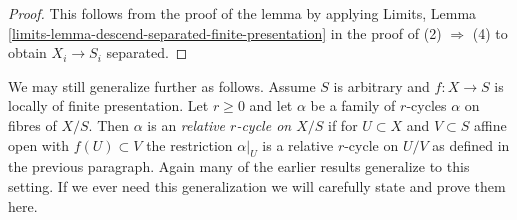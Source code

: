 \begin{proof}
This follows from the proof of the lemma by applying
Limits, Lemma \ref{limits-lemma-descend-separated-finite-presentation}
in the proof of (2) $\Rightarrow$ (4) to obtain $X_i \to S_i$ separated.
\end{proof}

\begin{remark}
\label{remark-more-general}
We may still generalize further as follows.
Assume $S$ is arbitrary and $f : X \to S$ is locally of finite presentation.
Let $r \geq 0$ and let $\alpha$ be a family of $r$-cycles $\alpha$ on fibres of
$X/S$. Then $\alpha$ is an {\it relative $r$-cycle on $X/S$} if
for $U \subset X$ and $V \subset S$ affine open with $f(U) \subset V$
the restriction $\alpha|_U$ is a relative $r$-cycle on $U/V$ as
defined in the previous paragraph. Again many of the earlier results
generalize to this setting.
If we ever need this generalization we will carefully state and prove
them here.
\end{remark}

























